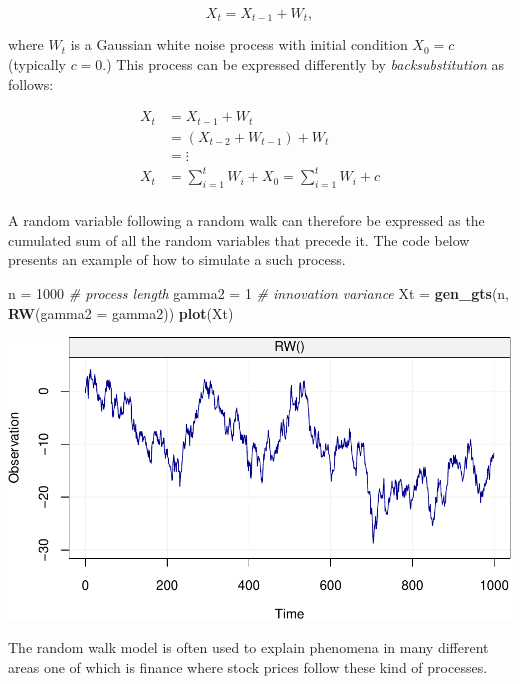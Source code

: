 \documentclass[]{book}
\newenvironment{Shaded}{\begin{snugshade}}{\end{snugshade}}
\newcommand{\CommentTok}[1]{\textcolor[rgb]{0.56,0.35,0.01}{\textit{#1}}}
\newcommand{\DataTypeTok}[1]{\textcolor[rgb]{0.13,0.29,0.53}{#1}}
\newcommand{\DecValTok}[1]{\textcolor[rgb]{0.00,0.00,0.81}{#1}}
\newcommand{\KeywordTok}[1]{\textcolor[rgb]{0.13,0.29,0.53}{\textbf{#1}}}
\newcommand{\NormalTok}[1]{#1}
\newcommand{\StringTok}[1]{\textcolor[rgb]{0.31,0.60,0.02}{#1}}
\theoremstyle{definition}
\theoremstyle{definition}
\theoremstyle{definition}
\theoremstyle{remark}
\begin{document}
\[X_t = X_{t-1} + W_t,\]

where \(W_t\) is a Gaussian white noise process with initial condition
\(X_0 = c\) (typically \(c = 0\).) This process can be expressed
differently by \emph{backsubstitution} as follows:

\[\begin{aligned}
  {X_t} &= {X_{t - 1}} + {W_t} \\
   &= \left( {{X_{t - 2}} + {W_{t - 1}}} \right) + {W_t} \\
   &= \vdots \\
  {X_t} &= \sum\limits_{i = 1}^t {{W_i}} + X_0 =  \sum\limits_{i = 1}^t {{W_i}} + c \\ 
\end{aligned} \]

A random variable following a random walk can therefore be expressed as
the cumulated sum of all the random variables that precede it. The code
below presents an example of how to simulate a such process.

\begin{Shaded}
\begin{Highlighting}[]
\NormalTok{n =}\StringTok{ }\DecValTok{1000}                               \CommentTok{# process length}
\NormalTok{gamma2 =}\StringTok{ }\DecValTok{1}                             \CommentTok{# innovation variance}
\NormalTok{Xt =}\StringTok{ }\KeywordTok{gen_gts}\NormalTok{(n, }\KeywordTok{RW}\NormalTok{(}\DataTypeTok{gamma2 =}\NormalTok{ gamma2))}
\KeywordTok{plot}\NormalTok{(Xt)}
\end{Highlighting}
\end{Shaded}

\includegraphics{ts_files/figure-latex/example_RW-1.pdf}

The random walk model is often used to explain phenomena in many
different areas one of which is finance where stock prices follow these
kind of processes.
\end{document}
